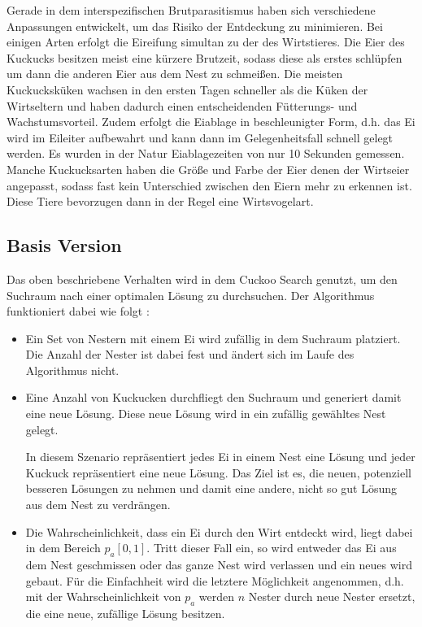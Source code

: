 \documentclass[conference]{IEEEtran}
\begin{document}
      Gerade in dem interspezifischen Brutparasitismus haben sich verschiedene Anpassungen entwickelt, um das Risiko der Entdeckung 
      zu minimieren. Bei einigen Arten erfolgt die Eireifung simultan zu der des Wirtstieres. Die Eier des Kuckucks besitzen meist 
      eine kürzere Brutzeit, sodass diese als erstes schlüpfen um dann die anderen Eier aus dem Nest zu schmeißen. Die meisten 
      Kuckucksküken wachsen in den ersten Tagen schneller als die Küken der Wirtseltern und haben dadurch einen entscheidenden 
      Fütterungs- und Wachstumsvorteil.  Zudem erfolgt die Eiablage in beschleunigter Form, d.h. das Ei wird im Eileiter aufbewahrt 
      und kann dann im Gelegenheitsfall schnell gelegt werden. Es wurden in der Natur Eiablagezeiten von nur 10 Sekunden gemessen. 
      Manche Kuckucksarten haben die Größe und Farbe der Eier denen der Wirtseier angepasst, sodass fast kein Unterschied zwischen 
      den Eiern mehr zu erkennen ist. Diese Tiere bevorzugen dann in der Regel eine Wirtsvogelart.         


    \subsection{Basis Version}
      Das oben beschriebene Verhalten wird in dem Cuckoo Search genutzt, um den Suchraum nach einer optimalen Lösung 
      zu durchsuchen. Der Algorithmus funktioniert dabei wie folgt \cite{b1}:

      \begin{itemize}
        \item Ein Set von Nestern mit einem Ei wird zufällig in dem Suchraum platziert. Die Anzahl der Nester 
          ist dabei fest und ändert sich im Laufe des Algorithmus nicht. 

        \item Eine Anzahl von Kuckucken durchfliegt den Suchraum und generiert damit eine neue Lösung. Diese 
          neue Lösung wird in ein zufällig gewähltes Nest gelegt. 

          In diesem Szenario repräsentiert jedes Ei in einem Nest eine Lösung und jeder Kuckuck repräsentiert eine 
          neue Lösung. Das Ziel ist es, die neuen, potenziell besseren Lösungen zu nehmen und damit eine andere, 
          nicht so gut Lösung aus dem Nest zu verdrängen. 

        \item Die Wahrscheinlichkeit, dass ein Ei durch den Wirt entdeckt wird, liegt dabei in dem Bereich $p_{a}[0,1]$. 
          Tritt dieser Fall ein, so wird entweder das Ei aus dem Nest geschmissen oder das ganze Nest wird verlassen 
          und ein neues wird gebaut. Für die Einfachheit wird die letztere Möglichkeit angenommen, d.h. mit 
          der Wahrscheinlichkeit von $p_{a}$ werden $n$ Nester durch neue Nester ersetzt, die eine neue, zufällige Lösung besitzen. 
      \end{itemize}
\end{document}
